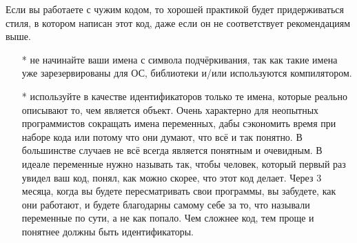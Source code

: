 \documentclass[a4paper,16pt]{report} %
\begin{document}
Если вы работаете с чужим кодом, то хорошей практикой будет придерживаться стиля, в котором написан этот код, даже если он не соответствует рекомендациям выше.

\begin{itemize}
\item[*] не начинайте ваши имена с символа подчёркивания, так как такие имена уже зарезервированы для ОС, библиотеки и/или используются компилятором.
\item[*] используйте в качестве идентификаторов только те имена, которые реально описывают то, чем является объект. Очень характерно для неопытных программистов сокращать имена переменных, дабы сэкономить время при наборе кода или потому что они думают, что всё и так понятно. В большинстве случаев не всё всегда является понятным и очевидным. В идеале переменные нужно называть так, чтобы человек, который первый раз увидел ваш код, понял, как можно скорее, что этот код делает. Через 3 месяца, когда вы будете пересматривать свои программы, вы забудете, как они работают, и будете благодарны самому себе за то, что называли переменные по сути, а не как попало. Чем сложнее код, тем проще и понятнее должны быть идентификаторы.
\end{itemize}
\end{document}
